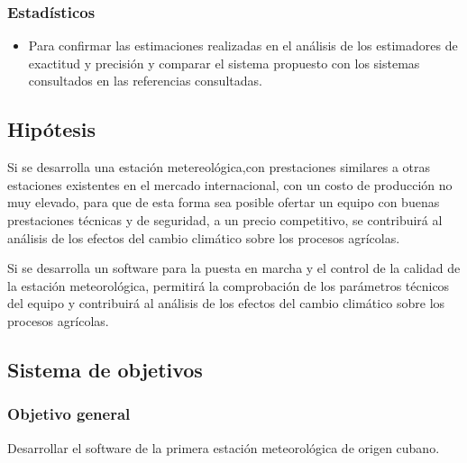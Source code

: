 \documentclass[12pt,letterpaper]{article}
\begin{document}
\begin{sloppypar}
        \subsubsection{Estadísticos}
        \begin{itemize}
            \item Para confirmar las estimaciones realizadas en el análisis
            de los estimadores de
            exactitud y precisión y comparar el sistema propuesto con los
            sistemas
            consultados en las referencias consultadas.
        \end{itemize}

        \subsection{Hipótesis}\label{subsec:hipotesis}
        Si se desarrolla una estación metereológica,con prestaciones
        similares a otras
        estaciones existentes en el mercado internacional, con un costo de
        producción
        no muy elevado, para que de esta forma sea posible ofertar un equipo
        con buenas
        prestaciones técnicas y de seguridad, a un precio competitivo, se
        contribuirá
        al análisis de los efectos del cambio climático sobre los procesos
        agrícolas.

        Si se desarrolla un software para la puesta en marcha y el control de la
        calidad de la estación meteorológica, permitirá la comprobación de los
        parámetros técnicos del equipo y contribuirá al análisis de los
        efectos del
        cambio climático sobre los procesos agrícolas.

        \subsection{Sistema de objetivos}\label{subsec:sistema-de-objetivos}

        \subsubsection*{Objetivo general}
        Desarrollar el software de la primera estación meteorológica de
        origen cubano.


\end{sloppypar}
\end{document}
